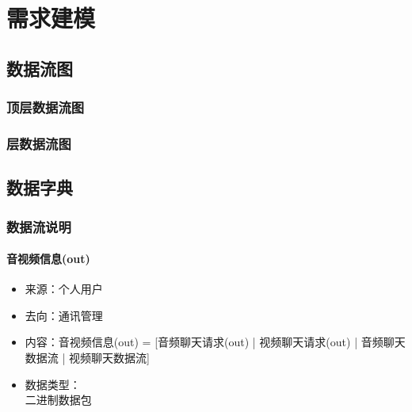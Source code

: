 \chapter{需求建模 }
    \section{数据流图}

        \subsection{顶层数据流图}

        \subsection{层数据流图}

    \section{数据字典}

        \subsection{数据流说明}
            
            \subsubsection{音视频信息(out)}
            \begin{itemize}
                \item 来源：个人用户
                \item 去向：通讯管理
                \item 内容：音视频信息(out) = [音频聊天请求(out) | 视频聊天请求(out) | 音频聊天数据流 | 视频聊天数据流]
                \item 数据类型：\\
                二进制数据包\\
            \end{itemize}
